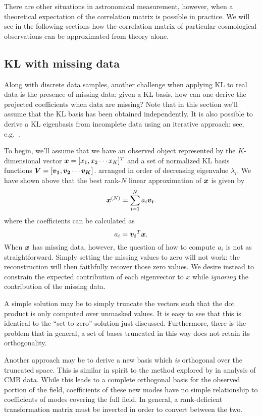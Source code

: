 There are other situations in astronomical measurement, however, when a
theoretical expectation of the correlation matrix is possible in practice.
We will see in the following sections how the correlation matrix of
particular cosmological observations can be approximated from theory alone.


\subsection{KL with missing data}
Along with discrete data samples, another challenge when applying KL to
real data is the presence of missing data: given a KL basis, how can
one derive the projected coefficients when data are missing?
Note that in this section we'll assume that the KL basis has been
obtained independently.  It is also possible to derive a KL eigenbasis
from incomplete data using an iterative approach:
see, e.g.~\citet{Connolly99, Yip04a}.

To begin, we'll assume that we have
an observed object represented by the $K$-dimensional vector 
$\boldsymbol{x} = [x_1, x_2 \cdots x_K]^T$ and a set of normalized
KL basis functions 
$\boldsymbol{V} = [\boldsymbol{v_1}, \boldsymbol{v_2} \cdots \boldsymbol{v_K}]$.
arranged in order of decreasing eigenvalue $\lambda_i$.  We have shown above
that the best rank-$N$ linear approximation of $\boldsymbol{x}$ is given by
\begin{equation}
  \boldsymbol{x}^{(N)} = \sum_{i=1}^{N}a_i\boldsymbol{v_i}.
\end{equation}
where the coefficients can be calculated as
\begin{equation}
  \label{eq:a_coeff_def}
  a_i = \boldsymbol{v_i}^T\boldsymbol{x}.
\end{equation}
When $\boldsymbol{x}$ has missing data,
however, the question of how to compute $a_i$ is not as straightforward.
Simply setting the missing values to zero
will not work: the reconstruction will then faithfully recover those
zero values.  We desire instead to constrain the expected contribution
of each eigenvector to $x$ while {\it ignoring} the contribution of the
missing data.

A simple solution may be to simply truncate the vectors such that the dot
product is only computed over unmasked values.  It is easy to see that this
is identical to the  ``set to zero'' solution just
discussed.  Furthermore, there is the problem that in general, a set
of bases truncated in this way does not retain its orthogonality.

Another approach may be to derive a new basis which {\it is} orthogonal
over the truncated space.  This is similar in spirit to the method
explored by \citet{Gorski1994} in analysis of CMB data.
While this leads to a complete orthogonal basis for the observed portion
of the field, coefficients of these new modes have no simple relationship to
coefficients of modes covering the full field.  In general, a rank-deficient
transformation matrix must be inverted in order to convert between the two.


